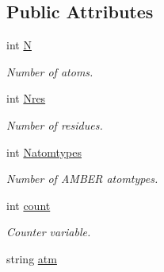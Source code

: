 \subsection*{Public Attributes}
\begin{DoxyCompactItemize}
\item 
\hypertarget{classPRMTOP_a8afaf54b7d07f2bca4ecd90468d21a70}{
int \hyperlink{classPRMTOP_a8afaf54b7d07f2bca4ecd90468d21a70}{N}}
\label{classPRMTOP_a8afaf54b7d07f2bca4ecd90468d21a70}

\begin{DoxyCompactList}\small\item\em Number of atoms. \item\end{DoxyCompactList}\item 
\hypertarget{classPRMTOP_a385cc1c43a0e7033adcf72f6bef12c95}{
int \hyperlink{classPRMTOP_a385cc1c43a0e7033adcf72f6bef12c95}{Nres}}
\label{classPRMTOP_a385cc1c43a0e7033adcf72f6bef12c95}

\begin{DoxyCompactList}\small\item\em Number of residues. \item\end{DoxyCompactList}\item 
\hypertarget{classPRMTOP_a9c933007652dbf34f73bf703b52f74af}{
int \hyperlink{classPRMTOP_a9c933007652dbf34f73bf703b52f74af}{Natomtypes}}
\label{classPRMTOP_a9c933007652dbf34f73bf703b52f74af}

\begin{DoxyCompactList}\small\item\em Number of AMBER atomtypes. \item\end{DoxyCompactList}\item 
\hypertarget{classPRMTOP_a78bc895ea33fed199c7e1824afd4b677}{
int \hyperlink{classPRMTOP_a78bc895ea33fed199c7e1824afd4b677}{count}}
\label{classPRMTOP_a78bc895ea33fed199c7e1824afd4b677}

\begin{DoxyCompactList}\small\item\em Counter variable. \item\end{DoxyCompactList}\item 
\hypertarget{classPRMTOP_ae4e8f933a71e6128b603c0b3e9ef6a71}{
string \hyperlink{classPRMTOP_ae4e8f933a71e6128b603c0b3e9ef6a71}{atm}}
\label{classPRMTOP_ae4e8f933a71e6128b603c0b3e9ef6a71}


\end{DoxyCompactItemize}
